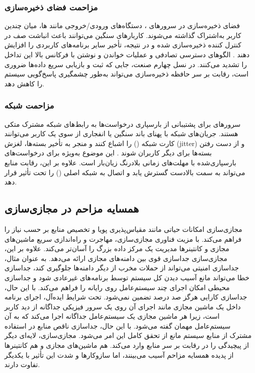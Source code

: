 \subsubsection{مزاحمت فضای ذخیره‌سازی}

فضای ذخیره‌سازی در سرورهای ، دستگاه‌های ورودی/خروجی مانند ها، میان چندین کاربر به‌اشتراک گذاشته می‌شوند. کاربارهای سنگین  می‌توانند باعث انباشت صف در کنترل کننده ذخیره‌سازی شده و در نتیجه، تأخیر  سایر برنامه‌های کاربردی را افزایش دهند \cite{pu2010iointerference}. الگوهای دسترسی تصادفی و عملیات خواندن و نوشتن با فرکانس بالا این تداخل را تشدید می‌کنند\cite{huang2018ioresource}. در نسل چهارم صنعت، جایی که ثبت و بازیابی سریع داده‌ها ضروری است، رقابت بر سر حافظه ذخیره‌سازی می‌تواند به‌طور چشمگیری پاسخ‌گویی سیستم را کاهش دهد.

\subsubsection{مزاحمت شبکه}

سرورهای  برای پشتیبانی از بارسپاری درخواست‌ها به رابط‌های شبکه مشترک متکی هستند. جریان‌های شبکه با پهنای باند سنگین یا انفجاری از سوی یک کاربر می‌توانند کارت شبکه () را اشباع کنند و منجر به تأخیر بسته‌ها، لغزش (jitter) و از دست رفتن بسته‌ها برای دیگر کاربران شوند \cite{pu2010iointerference}. این موضوع به‌ویژه برای درخواست‌های بارسپاری‌شده با مهلت‌های زمانی بلادرنگ زیان‌بار است. علاوه بر این، رقابت منابع می‌تواند به سمت بالادست گسترش یابد و اتصال به شبکه اصلی () را تحت تأثیر قرار دهد.

\subsection{همسایه مزاحم در مجازی‌سازی}

مجازی‌سازی امکانات حیاتی مانند مقیاس‌پذیری پویا و تخصیص منابع بر حسب نیاز را فراهم می‌کند. با مزیت فناوری مجازی‌سازی، مهاجرت و راه‌اندازی سریع ماشین‌های مجازی و کانتینرها مدیریت یک مرکز داده بزرگ را آسان‌تر می‌کند. علاوه بر این، مجازی‌سازی جداسازی قوی بین دامنه‌های مجازی ارائه می‌دهد. به عنوان مثال، جداسازی امنیتی می‌تواند از حملات مخرب از دیگر دامنه‌ها جلوگیری کند، جداسازی خطا می‌تواند مانع آسیب دیدن کل سیستم توسط برنامه‌های غیرعادی شود و جداسازی محیطی امکان اجرای چند سیستم‌عامل روی رایانه را فراهم می‌کند. با این حال، جداسازی کارایی هرگز صد درصد تضمین نمی‌شود. تحت شرایط ایده‌آل، اجرای برنامه داخل یک ماشین مجازی مانند اجرای آن روی یک سرور فیزیکی جداگانه از دید کاربر است، زیرا هر ماشین مجازی یک سیستم‌عامل جداگانه اجرا می‌کند که به آن سیستم‌عامل مهمان گفته می‌شود. با این حال، جداسازی ناقص منابع در استفاده مشترک از منابع سیستم مانع از تحقق کامل این امر می‌شود. مجازی‌سازی، لایه‌ای دیگر از پیچیدگی را در رقابت بر سر منابع وارد می‌کند. هم ماشین‌های مجازی و هم کانتینرها از پدیده همسایه مزاحم آسیب می‌بینند، اما سازوکارها و شدت این تأثیر با یکدیگر تفاوت دارند.

